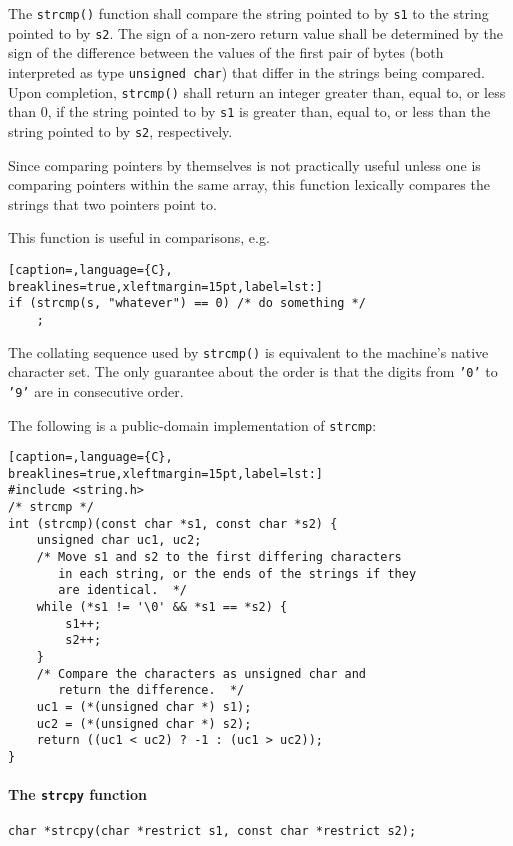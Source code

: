The \texttt{strcmp()} function shall compare the string pointed to by
\texttt{s1} to the string pointed to by \texttt{s2}. The sign of a non-zero
return value shall be determined by the sign of the difference between the
values of the first pair of bytes (both interpreted as type \texttt{unsigned
char}) that differ in the strings being compared. Upon completion,
\texttt{strcmp()} shall return an integer greater than, equal to, or less than
0, if the string pointed to by \texttt{s1} is greater than, equal to, or less
than the string pointed to by \texttt{s2}, respectively.

Since comparing pointers by themselves is not practically useful unless one is
comparing pointers within the same array, this function lexically compares the
strings that two pointers point to.

This function is useful in comparisons, e.g.
\lstset{basicstyle=\scriptsize, numbers=left, captionpos=b, tabsize=4}
\begin{lstlisting}[caption=,language={C},
breaklines=true,xleftmargin=15pt,label=lst:]
if (strcmp(s, "whatever") == 0) /* do something */
    ;
\end{lstlisting}

The collating sequence used by \texttt{strcmp()} is equivalent to the machine's
native character set. The only guarantee about the order is that the digits
from \texttt{'0'} to \texttt{'9'} are in consecutive order.

The following is a public-domain implementation of \texttt{strcmp}:
\lstset{basicstyle=\scriptsize, numbers=left, captionpos=b, tabsize=4}
\begin{lstlisting}[caption=,language={C},
breaklines=true,xleftmargin=15pt,label=lst:]
#include <string.h>
/* strcmp */
int (strcmp)(const char *s1, const char *s2) {
	unsigned char uc1, uc2;
	/* Move s1 and s2 to the first differing characters 
	   in each string, or the ends of the strings if they
	   are identical.  */
	while (*s1 != '\0' && *s1 == *s2) {
		s1++;
		s2++;
	}
	/* Compare the characters as unsigned char and
	   return the difference.  */
	uc1 = (*(unsigned char *) s1);
	uc2 = (*(unsigned char *) s2);
	return ((uc1 < uc2) ? -1 : (uc1 > uc2));
}
\end{lstlisting}

\paragraph{The \texttt{strcpy} function}
\texttt{char *strcpy(char *restrict s1, const char *restrict s2);}

